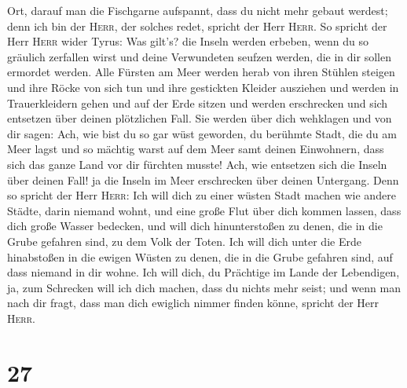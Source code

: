 Ort, darauf man die Fischgarne aufspannt, dass du nicht mehr gebaut
werdest; denn ich bin der \textsc{Herr}, der solches redet, spricht der
Herr \textsc{Herr}.  So spricht der Herr \textsc{Herr}
wider Tyrus: Was gilt's? die Inseln werden erbeben, wenn du so gräulich
zerfallen wirst und deine Verwundeten seufzen werden, die in dir sollen
ermordet werden.  Alle Fürsten am Meer werden herab von
ihren Stühlen steigen und ihre Röcke von sich tun und ihre gestickten
Kleider ausziehen und werden in Trauerkleidern gehen und auf der Erde
sitzen und werden erschrecken und sich entsetzen über deinen plötzlichen
Fall.  Sie werden über dich wehklagen und von dir sagen:
Ach, wie bist du so gar wüst geworden, du berühmte Stadt, die du am Meer
lagst und so mächtig warst auf dem Meer samt deinen Einwohnern, dass
sich das ganze Land vor dir fürchten musste!  Ach, wie
entsetzen sich die Inseln über deinen Fall! ja die Inseln im Meer
erschrecken über deinen Untergang.  Denn so spricht der
Herr \textsc{Herr}: Ich will dich zu einer wüsten Stadt machen wie
andere Städte, darin niemand wohnt, und eine große Flut über dich kommen
lassen, dass dich große Wasser bedecken,  und will dich
hinunterstoßen zu denen, die in die Grube gefahren sind, zu dem Volk der
Toten. Ich will dich unter die Erde hinabstoßen in die ewigen Wüsten zu
denen, die in die Grube gefahren sind, auf dass niemand in dir wohne.
Ich will dich, du Prächtige im Lande der Lebendigen,  ja,
zum Schrecken will ich dich machen, dass du nichts mehr seist; und wenn
man nach dir fragt, dass man dich ewiglich nimmer finden könne, spricht
der Herr \textsc{Herr}.

\hypertarget{section-26}{%
\section{27}\label{section-26}}

